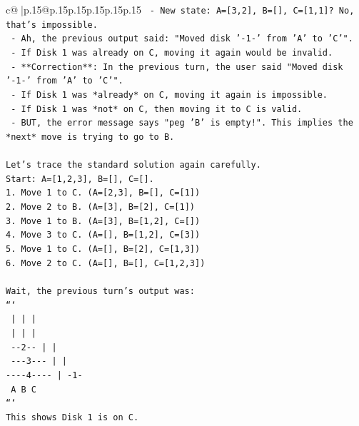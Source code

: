 \documentclass{article}
\begin{document}
{\begin{supertabular}{c@{$\;$}|p{.15\linewidth}@{}p{.15\linewidth}p{.15\linewidth}p{.15\linewidth}p{.15\linewidth}p{.15\linewidth}}
{{{\texttt{   {-} New state: A={[}3,2{]}, B={[}{]}, C={[}1,1{]}? No, that's impossible.} \\
\texttt{   {-} Ah, the previous output said: "Moved disk '{-}1{-}' from 'A' to 'C'".} \\
\texttt{   {-} If Disk 1 was already on C, moving it again would be invalid.} \\
\texttt{   {-} **Correction**: In the previous turn, the user said "Moved disk '{-}1{-}' from 'A' to 'C'".} \\
\texttt{   {-} If Disk 1 was *already* on C, moving it again is impossible.} \\
\texttt{   {-} If Disk 1 was *not* on C, then moving it to C is valid.} \\
\texttt{   {-} BUT, the error message says "peg 'B' is empty!". This implies the *next* move is trying to go to B.} \\
\\ 
\texttt{Let's trace the standard solution again carefully.} \\
\texttt{Start: A={[}1,2,3{]}, B={[}{]}, C={[}{]}.} \\
\texttt{1. Move 1 to C. (A={[}2,3{]}, B={[}{]}, C={[}1{]})} \\
\texttt{2. Move 2 to B. (A={[}3{]}, B={[}2{]}, C={[}1{]})} \\
\texttt{3. Move 1 to B. (A={[}3{]}, B={[}1,2{]}, C={[}{]})} \\
\texttt{4. Move 3 to C. (A={[}{]}, B={[}1,2{]}, C={[}3{]})} \\
\texttt{5. Move 1 to C. (A={[}{]}, B={[}2{]}, C={[}1,3{]})} \\
\texttt{6. Move 2 to C. (A={[}{]}, B={[}{]}, C={[}1,2,3{]})} \\
\\ 
\texttt{Wait, the previous turn's output was:} \\
\texttt{```} \\
\texttt{    |         |         |    } \\
\texttt{    |         |         |    } \\
\texttt{  {-}{-}2{-}{-}       |         |    } \\
\texttt{ {-}{-}{-}3{-}{-}{-}      |         |    } \\
\texttt{{-}{-}{-}{-}4{-}{-}{-}{-}     |        {-}1{-}   } \\
\texttt{    A         B         C    } \\
\texttt{```} \\
\texttt{This shows Disk 1 is on C.} \\
}}}
\end{supertabular}}
\end{document}
